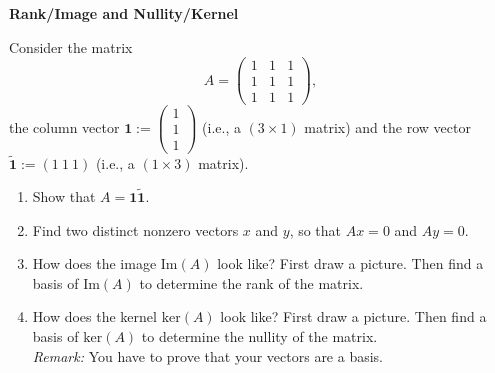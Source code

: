 \textbf{Rank/Image and Nullity/Kernel}

Consider the matrix $$ A = \begin{pmatrix}1&1&1\\1&1&1\\1&1&1 \end{pmatrix} \nonumber,$$ the column vector $\mathbf{1} := \begin{pmatrix}1\\1\\1\end{pmatrix}$ (i.e., a $(3 \times 1)$ matrix) and the row vector $\tilde{\mathbf{1}} := (1~1~1)$ (i.e., a $(1 \times 3)$ matrix).

\begin{enumerate}
\item Show that $A =\mathbf{1}\tilde{\mathbf{1}} $.
\item Find two distinct nonzero vectors $x$ and $y$, so that $Ax = 0$ and $Ay = 0$.
\item How does the image $\text{Im}(A)$ look like? First draw a picture. Then find a basis of $\text{Im}(A)$ to determine the rank of the matrix.
\item How does the kernel $\text{ker}(A) $ look like? First draw a picture. Then find a basis of $\text{ker}(A)$ to determine the nullity of the matrix. \\[0.1cm]
\textit{Remark:} You have to prove that your vectors are a basis. 
\end{enumerate}


